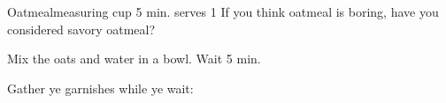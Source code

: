 \begin{recipe}{Oatmeal}{measuring cup \hfill 5 min.}{ \hfill serves 1}
 \freeform If you think oatmeal is boring, have you considered savory oatmeal?

 Mix the oats and water in a bowl. Wait 5 min.

 \freeform Gather ye garnishes while ye wait:
\end{recipe}
